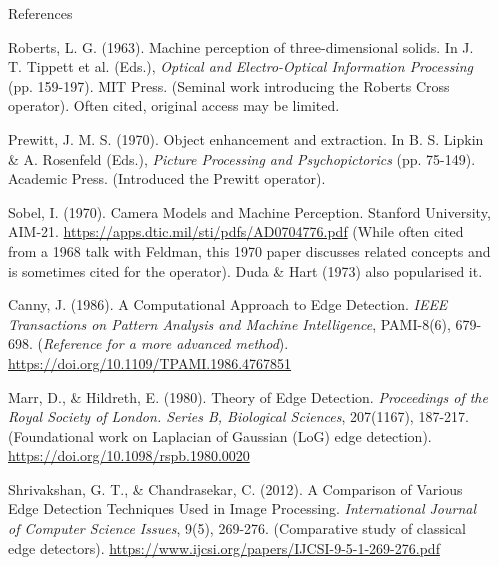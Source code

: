 \documentclass[final]{beamer}
\newlength{\sepwidth}
\newlength{\colwidth}
\newcommand{\separatorcolumn}{\begin{column}{\sepwidth}\end{column}}
\begin{document}
\begin{frame}[t]
\begin{columns}[t]
\begin{column}{\colwidth}
\begin{block}{References}
\begin{thebibliography}{9}
        Roberts, L. G. (1963). Machine perception of three-dimensional solids. In J. T. Tippett et al. (Eds.), \textit{Optical and Electro-Optical Information Processing} (pp. 159-197). MIT Press.
        \newblock (Seminal work introducing the Roberts Cross operator). Often cited, original access may be limited.

        Prewitt, J. M. S. (1970). Object enhancement and extraction. In B. S. Lipkin \& A. Rosenfeld (Eds.), \textit{Picture Processing and Psychopictorics} (pp. 75-149). Academic Press.
        \newblock (Introduced the Prewitt operator).

         Sobel, I. (1970). Camera Models and Machine Perception. Stanford University, AIM-21. \url{https://apps.dtic.mil/sti/pdfs/AD0704776.pdf} 
        \newblock (While often cited from a 1968 talk with Feldman, this 1970 paper discusses related concepts and is sometimes cited for the operator). Duda \& Hart (1973) also popularised it.

        Canny, J. (1986). A Computational Approach to Edge Detection. \textit{IEEE Transactions on Pattern Analysis and Machine Intelligence}, PAMI-8(6), 679-698.
        \newblock (\textit{Reference for a more advanced method}). \url{https://doi.org/10.1109/TPAMI.1986.4767851}

        Marr, D., \& Hildreth, E. (1980). Theory of Edge Detection. \textit{Proceedings of the Royal Society of London. Series B, Biological Sciences}, 207(1167), 187-217.
        \newblock (Foundational work on Laplacian of Gaussian (LoG) edge detection). \url{https://doi.org/10.1098/rspb.1980.0020}

        Shrivakshan, G. T., \& Chandrasekar, C. (2012). A Comparison of Various Edge Detection Techniques Used in Image Processing. \textit{International Journal of Computer Science Issues}, 9(5), 269-276.
        \newblock (Comparative study of classical edge detectors). \url{https://www.ijcsi.org/papers/IJCSI-9-5-1-269-276.pdf}

    \end{thebibliography}
\end{block}

\end{column} %

\separatorcolumn %

\end{columns} %
\end{frame} %
\end{document}
